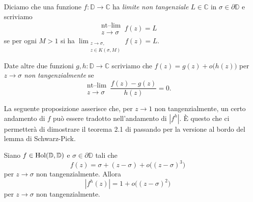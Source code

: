 \begin{defn}
  Diciamo che una funzione $f:\mathbb{D} \longrightarrow \mathbb{C}$ ha \textit{limite non tangenziale} $L \in \mathbb{C}$ in $\sigma \in \partial\mathbb{D}$ e scriviamo
  $$\substack{\text{nt--lim} \\ z \longrightarrow \sigma} \, f(z)=L$$
  se  per ogni $M>1$ si ha $\displaystyle \lim_{\substack{z \longrightarrow \sigma, \\ z \in K(\sigma,M)}} f(z)=L$.

  Date altre due funzioni $g,h: \mathbb{D} \longrightarrow \mathbb{C}$ scriviamo che $f(z)=g(z)+o\bigl(h(z)\bigr)$ per $z \longrightarrow \sigma$ \textit{non tangenzialmente} se
  $$\substack{\text{nt--lim} \\ z \longrightarrow \sigma} \, \frac{f(z)-g(z)}{h(z)}=0.$$
\end{defn}

La seguente proposizione asserisce che, per $z \longrightarrow 1$ non tangenzialmente, un certo andamento di $f$ può essere tradotto nell'andamento di $|f^h|$. È questo che ci permetterà di dimostrare il teorema 2.1 di \cite{BK} passando per la versione al bordo del lemma di Schwarz-Pick.

\begin{prop} \label{o^3->o^2}
  Siano $f \in \text{\normalfont{Hol}}(\mathbb{D},\mathbb{D})$ e $\sigma \in \partial\mathbb{D}$ tali che
  \begin{equation} \label{o^3}
    f(z)=\sigma+(z-\sigma)+o\bigl((z-\sigma)^3\bigr)
  \end{equation}
  per $z \longrightarrow \sigma$ non tangenzialmente. Allora
  \begin{equation} \label{o^2}
    |f^h(z)|=1+o\bigl((z-\sigma)^2\bigr)
  \end{equation}
  per $z \longrightarrow \sigma$ non tangenzialmente.
\end{prop}

